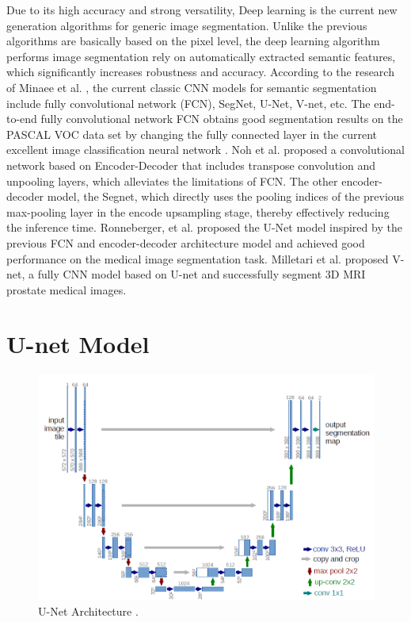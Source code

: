 \documentclass[10pt, a4paper]{article}
\begin{document}
\begin{multicols}{2}
	\par
	Due to its high accuracy and strong versatility, Deep learning is the current new generation algorithms for generic image segmentation. Unlike the previous algorithms are basically based on the pixel level, the deep learning algorithm performs image segmentation rely on automatically extracted semantic features, which significantly increases robustness and accuracy. According to the research of Minaee et al. \cite{minaee2020image}, the current classic CNN models for semantic segmentation include fully convolutional network (FCN), SegNet, U-Net, V-net, etc. The end-to-end fully convolutional network FCN obtains good segmentation results on the PASCAL VOC data set by changing the fully connected layer in the current excellent image classification neural network \cite{long2015fully}. Noh et al. \cite{noh2015learning} proposed a convolutional network based on Encoder-Decoder that includes transpose convolution and unpooling layers, which alleviates the limitations of FCN. The other encoder-decoder model, the Segnet, which directly uses the pooling indices of the previous max-pooling layer in the encode upsampling stage, thereby effectively reducing the inference time\cite{badrinarayanan2017segnet}. Ronneberger, et al. \cite{ronneberger2015u} proposed the U-Net model inspired by the previous FCN and encoder-decoder architecture model and achieved good performance on the medical image segmentation task. Milletari et al. \cite{milletari2016v} proposed V-net, a fully CNN model based on U-net and successfully segment 3D MRI prostate medical images. 

	\section{U-net Model} \justify
	\begin{figure} %
        \centering
	  \includegraphics[width=0.5\linewidth]{Capture.PNG}
	  \caption{U-Net Architecture \cite{ronneberger2015u}.}
	  \label{fig:Unet}
	\end{figure}


\end{multicols}
\end{document}
